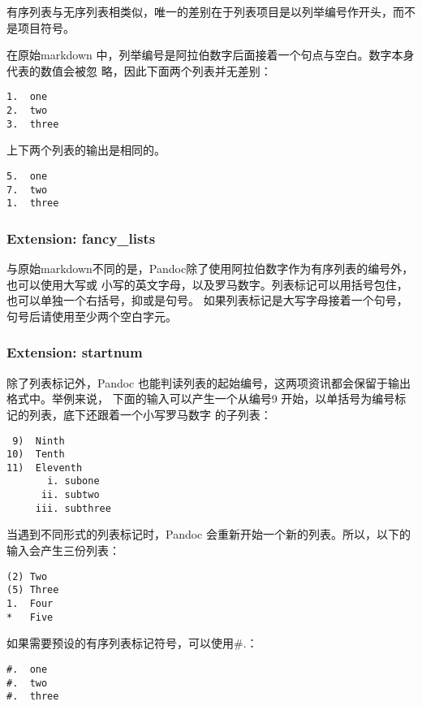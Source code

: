 \documentclass[cn]{elegantbook}
\begin{document}
有序列表与无序列表相类似，唯一的差别在于列表项目是以列举编号作开头，而不是项目符号。

在原始markdown
中，列举编号是阿拉伯数字后面接着一个句点与空白。数字本身代表的数值会被忽
略，因此下面两个列表并无差别：

\begin{lstlisting}
1.  one
2.  two
3.  three
\end{lstlisting}

上下两个列表的输出是相同的。

\begin{lstlisting}
5.  one
7.  two
1.  three
\end{lstlisting}

\hypertarget{extension-fancy_lists}{%
\subsubsection{Extension: fancy\_lists}\label{extension-fancy_lists}}

与原始markdown不同的是，Pandoc除了使用阿拉伯数字作为有序列表的编号外，也可以使用大写或
小写的英文字母，以及罗马数字。列表标记可以用括号包住，也可以单独一个右括号，抑或是句号。
如果列表标记是大写字母接着一个句号，句号后请使用至少两个空白字元。

\hypertarget{extension-startnum}{%
\subsubsection{Extension: startnum}\label{extension-startnum}}

除了列表标记外，Pandoc
也能判读列表的起始编号，这两项资讯都会保留于输出格式中。举例来说，
下面的输入可以产生一个从编号9
开始，以单括号为编号标记的列表，底下还跟着一个小写罗马数字 的子列表：

\begin{lstlisting}
 9)  Ninth
10)  Tenth
11)  Eleventh
       i. subone
      ii. subtwo
     iii. subthree
\end{lstlisting}

当遇到不同形式的列表标记时，Pandoc
会重新开始一个新的列表。所以，以下的输入会产生三份列表：

\begin{lstlisting}
(2) Two
(5) Three
1.  Four
*   Five
\end{lstlisting}

如果需要预设的有序列表标记符号，可以使用\#.：

\begin{lstlisting}
#.  one
#.  two
#.  three
\end{lstlisting}
\end{document}
